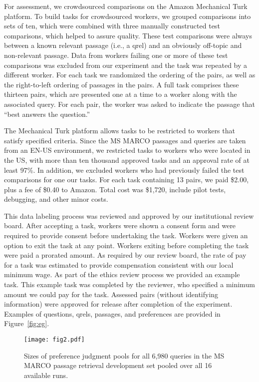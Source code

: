 \documentclass[fullpage]{article}
\begin{document}
For assessment, we crowdsourced comparisons on the Amazon Mechanical Turk platform. To build tasks for crowdsourced workers, we grouped comparisons into sets of ten, which were combined with three manually constructed test comparisons, which helped to assure quality. These test comparisons were always between a known relevant passage (i.e., a qrel) and an obviously off-topic and non-relevant passage. Data from workers failing one or more of these test comparisons was excluded from our experiment and the task was repeated by a different worker. For each task we randomized the ordering of the pairs, as well as the right-to-left ordering of passages in the pairs. A full task comprises these thirteen pairs, which are presented one at a time to a worker along with the associated query. For each pair, the worker was asked to indicate the passage that ``best answers the question.''

The Mechanical Turk platform allows tasks to be restricted to workers that satisfy specified criteria. Since the MS MARCO passages and queries are taken from an EN-US environment, we restricted tasks to workers who were located in the US, with more than ten thousand approved tasks and an approval rate of at least 97\%. In addition, we excluded workers who had previously failed the test comparisons for one our tasks. For each task containing 13 pairs, we paid \$2.00, plus a fee of \$0.40 to Amazon. Total cost was \$1,720, include pilot tests, debugging, and other minor costs.

This data labeling process was reviewed and approved by our institutional review board. After accepting a task, workers were shown a consent form and were required to provide consent before undertaking the task. Workers were given an option to exit the task at any point. Workers exiting before completing the task were paid a prorated amount. As required by our review board, the rate of pay for a task was estimated to provide compensation consistent with our local minimum wage.
As part of the ethics review process we provided an example task. This example task was completed by the reviewer, who specified a minimum amount we could pay for the task.
Assessed pairs (without identifying information) were approved for release after completion of the experiment.
Examples of questions, qrels, passages, and preferences are provided in Figure~\ref{fig:eg}.

\begin{figure}[p]
  \centering
  \texttt{[image: fig2.pdf]}
  \caption{Sizes of preference judgment pools for all 6,980 queries in the MS MARCO passage retrieval development set pooled over all 16 available runs.}
  \label{fig:bigpools}
  \vspace{-2em}
\end{figure}
\end{document}
